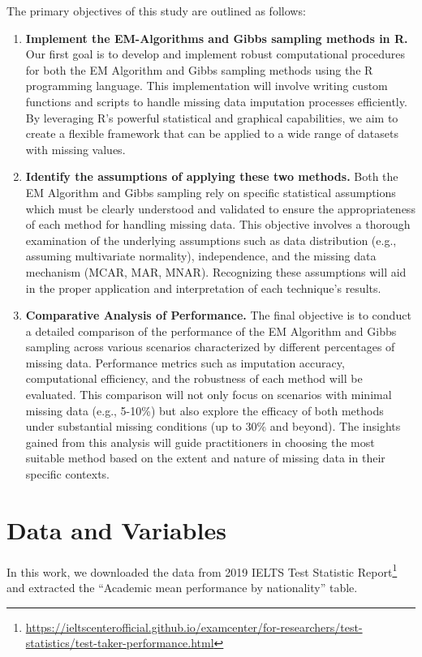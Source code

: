 \documentclass[12pt]{article}
\begin{document}
The primary objectives of this study are outlined as follows:

\begin{enumerate}
	\item \textbf{Implement the EM-Algorithms and Gibbs sampling methods in R.}
Our first goal is to develop and implement robust computational procedures for both the EM Algorithm and Gibbs sampling methods using the R programming language. This implementation will involve writing custom functions and scripts to handle missing data imputation processes efficiently. By leveraging R’s powerful statistical and graphical capabilities, we aim to create a flexible framework that can be applied to a wide range of datasets with missing values.
	\item \textbf{ Identify the assumptions of applying these two methods.}
Both the EM Algorithm and Gibbs sampling rely on specific statistical assumptions which must be clearly understood and validated to ensure the appropriateness of each method for handling missing data. This objective involves a thorough examination of the underlying assumptions such as data distribution (e.g., assuming multivariate normality), independence, and the missing data mechanism (MCAR, MAR, MNAR). Recognizing these assumptions will aid in the proper application and interpretation of each technique's results.
\item \textbf{Comparative Analysis of Performance.}
The final objective is to conduct a detailed comparison of the performance of the EM Algorithm and Gibbs sampling across various scenarios characterized by different percentages of missing data. Performance metrics such as imputation accuracy, computational efficiency, and the robustness of each method will be evaluated. This comparison will not only focus on scenarios with minimal missing data (e.g., 5-10\%) but also explore the efficacy of both methods under substantial missing conditions (up to 30\% and beyond). The insights gained from this analysis will guide practitioners in choosing the most suitable method based on the extent and nature of missing data in their specific contexts.
\end{enumerate}


\section{Data and Variables}

In this work, we downloaded the data from 2019 IELTS Test Statistic Report\footnote{\url{https://ieltscenterofficial.github.io/examcenter/for-researchers/test-statistics/test-taker-performance.html}} and extracted the ``Academic mean performance by nationality'' table.
\end{document}
